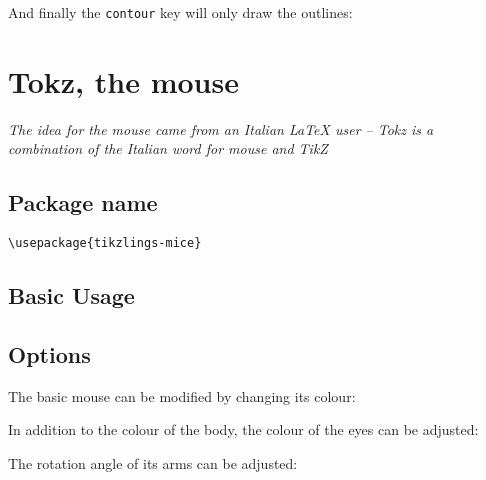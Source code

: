 \documentclass[parskip=half]{scrartcl}
\newcommand{\TikZ}{Ti\emph{k}Z\xspace}
\begin{document}
And finally the \lstinline|contour| key will only draw the outlines:
\begin{tcblisting}{}
\moles[contour=black]
\end{tcblisting}

%
%
\clearpage
\section[Mouse]{Tokz, the mouse}

\emph{The idea for the mouse came from an Italian \LaTeX{} user -- Tokz is a combination of the Italian word for mouse and \TikZ}

\subsection{Package name}

\begin{tcolorbox}[lower separated=false, lefthand width=.8\linewidth]
\vspace*{0.5cm}
\lstinline|\usepackage{tikzlings-mice}| 
\vspace*{0.5cm}
\end{tcolorbox}

\subsection{Basic Usage}

\begin{tcblisting}{}
\mouse
\end{tcblisting}

\subsection{Options}

The basic mouse can be modified by changing its colour:
\begin{tcblisting}{}
\mouse[body=blue]
\end{tcblisting}

In addition to the colour of the body, the colour of the eyes can be adjusted:
\begin{tcblisting}{}
\mouse[eye=red]
\end{tcblisting}

The rotation angle of its arms can be adjusted:
\begin{tcblisting}{}
\mouse[rotatearms=40]
\end{tcblisting}
\end{document}
